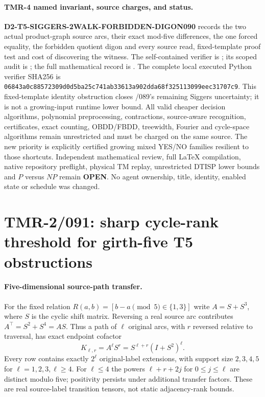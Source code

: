 \documentclass[11pt]{article}
\begin{document}
\paragraph{TMR-4 named invariant, source charges, and status.}
\textbf{D2-T5-SIGGERS-2WALK-FORBIDDEN-DIGON090} records
the two actual product-graph source arcs, their exact
mod-five differences, the one forced equality, the
forbidden quotient digon and every source read,
fixed-template proof test and cost of discovering the witness.
The self-contained verifier is
;
its scoped audit is
;
the full mathematical record is
.
The complete local executed Python verifier SHA256 is
\texttt{06843a0c88572309d0d5ba25c741ab33613a902dda68f325113099eec31707c9}.
This fixed-template identity obstruction closes /089's
remaining Siggers uncertainty; it is not a growing-input
runtime lower bound. All valid cheaper decision algorithms,
polynomial preprocessing, contractions, source-aware
recognition, certificates, exact counting, OBDD/FBDD,
treewidth, Fourier and cycle-space algorithms remain
unrestricted and must be charged on the same source.
The new priority is explicitly certified growing mixed
YES/NO families resilient to those shortcuts. Independent
mathematical review, full LaTeX compilation, native
repository preflight, physical TM replay, unrestricted
DTISP lower bounds and $P$ versus $NP$ remain
\textbf{OPEN}. No agent ownership, title, identity,
enabled state or schedule was changed.


\section{TMR-2/091: sharp cycle-rank threshold for girth-five T5 obstructions}

\paragraph{Five-dimensional source-path transfer.}
For the fixed relation $R(a,b)=[b-a\pmod5\in\{1,3\}]$ write
$A=S+S^3$, where $S$ is the cyclic shift matrix. Reversing a real
source arc contributes $A^\top=S^2+S^4=AS$. Thus a path of
$\ell$ original arcs, with $r$ reversed relative to traversal,
has exact endpoint cofactor
\[
K_{\ell,r}=A^\ell S^r=S^{\ell+r}(I+S^2)^\ell.
\]
Every row contains exactly $2^\ell$ original-label extensions,
with support size $2,3,4,5$ for $\ell=1,2,3,\ell\geq4$.
For $\ell\leq4$ the powers $\ell+r+2j$ for $0\leq j\leq\ell$
are distinct modulo five; positivity persists under additional
transfer factors. These are real source-label transition tensors,
not static adjacency-rank bounds.
\end{document}
